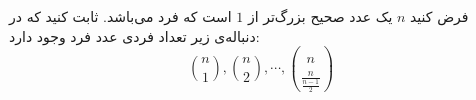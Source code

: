 \EXERCISE
فرض کنید
$n$
یک عدد صحیح بزرگ‌تر از
$1$
است که فرد می‌باشد. ثابت کنید که در دنباله‌ی زیر تعداد فردی عدد فرد وجود دارد:
$$\binom{n}{1}, \binom{n}{2}, \cdots, \binom{n}{\frac{n}{\frac{n-1}{2}}}$$